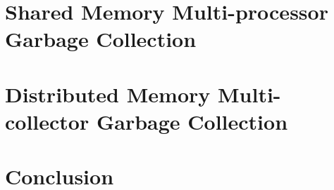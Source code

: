 \documentclass[12pt,letterpaper]{report}
\begin{document}
\begin{doublespace}
\begin{comment}
\chapter {Shared Memory Garbage Collection Systems}
\label{sharedmain}

\chapter {Shard Memory Single Collector Garbage Collection} 
\label{sharedsca}
\end{comment}

  \chapter{Shared Memory Multi-processor Garbage Collection}
 \label{shared}
   
  \chapter{Distributed Memory Multi-collector Garbage Collection}
     \label{distributed}
     
\chapter{Conclusion}
  \end{doublespace}

\newpage 




%

\begin{singlespace}


\end{singlespace}


\newpage 
  \begin{doublespace}

  \end{doublespace}
\end{document}
